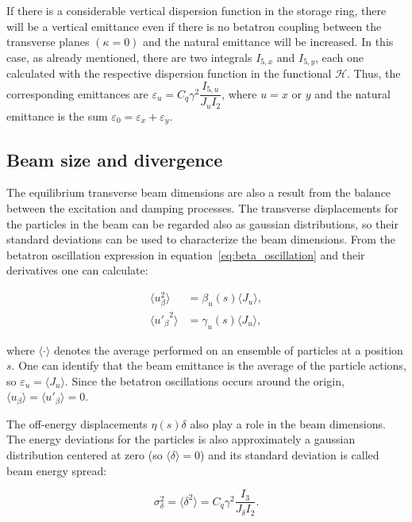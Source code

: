 If there is a considerable vertical dispersion function in the storage ring, there will be a vertical emittance even if there is no betatron coupling between the transverse planes $(\kappa = 0)$ and the natural emittance will be increased. In this case, as already mentioned, there are two integrals $I_{5, x}$ and $I_{5, y}$, each one calculated with the respective dispersion function in the functional $\mathcal{H}$. Thus, the corresponding emittances are $\varepsilon_u = C_q \gamma^2 \dfrac{I_{5, u}}{J_u I_2}$, where $u=x$ or $y$ and the natural emittance is the sum $\varepsilon_0 = \varepsilon_x + \varepsilon_y$.

\subsection{Beam size and divergence}

The equilibrium transverse beam dimensions are also a result from the balance between the excitation and damping processes. The transverse displacements for the particles in the beam can be regarded also as gaussian distributions, so their standard deviations can be used to characterize the beam dimensions. From the betatron oscillation expression in equation~\eqref{eq:beta_oscillation} and their derivatives one can calculate:

\begin{align}
    \langle u_{\beta}^2 \rangle &= \beta_u(s) \langle J_u \rangle,  \\
    \langle {u'_{\beta}}^{2} \rangle &= \gamma_u(s) \langle J_u \rangle,
\end{align}

where $\langle \cdot \rangle$ denotes the average performed on an ensemble of particles at a position $s$. One can identify that the beam emittance is the average of the particle actions, so $\varepsilon_u = \langle J_u \rangle$. Since the betatron oscillations occurs around the origin, $\langle u_{\beta}\rangle = \langle u'_{\beta}\rangle = 0$. 

The off-energy displacements $\eta(s)\delta$ also play a role in the beam dimensions. The energy deviations for the particles is also approximately a gaussian distribution centered at zero (so $\langle \delta \rangle = 0$) and its standard deviation is called beam energy spread:

\begin{equation}
    \sigma^2_{\delta} = \langle \delta ^2\rangle = C_q \gamma^2\dfrac{I_3}{J_{\delta}I_2}.
\end{equation}

